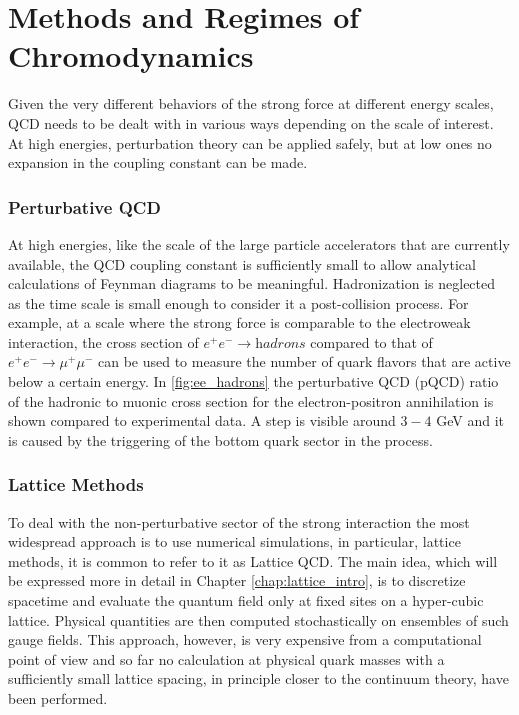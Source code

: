 \section{Methods and Regimes of Chromodynamics}
Given the very different behaviors of the strong force at different energy scales, QCD needs to be dealt with in various ways depending on the scale of interest. At high energies, perturbation theory can be applied safely, but at low ones no expansion in the coupling constant can be made. 

\subsubsection{Perturbative QCD}
At high energies, like the scale of the large particle accelerators that are currently available, the QCD coupling constant is sufficiently small to allow analytical calculations of Feynman diagrams to be meaningful. Hadronization is neglected as the time scale is small enough to consider it a post-collision process. 
For example, at a scale where the strong force is comparable to the electroweak interaction, the cross section of $e^+e^-\rightarrow \textit{hadrons}$ compared to that of $e^+e^-\rightarrow \mu^+\mu^-$ can be used to measure the number of quark flavors that are active below a certain energy. In \cref{fig:ee_hadrons} the perturbative QCD (pQCD) ratio of the hadronic to muonic cross section for the electron-positron annihilation is shown compared to experimental data. A step is visible around $3-4$ GeV and it is caused by the triggering of the bottom quark sector in the process. 


\subsubsection{Lattice Methods} 
To deal with the non-perturbative sector of the strong interaction the most widespread approach is to use numerical simulations, in particular, lattice methods, it is common to refer to it as Lattice QCD. The main idea, which will be expressed more in detail in Chapter \ref{chap:lattice_intro}, is to discretize spacetime and evaluate the quantum field only at fixed sites on a hyper-cubic lattice. Physical quantities are then computed stochastically on ensembles of such gauge fields. This approach, however, is very expensive from a computational point of view and so far no calculation at physical quark masses with a sufficiently small lattice spacing, in principle closer to the continuum theory, have been performed.

